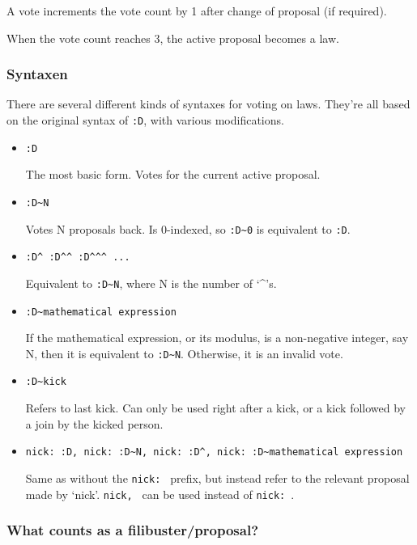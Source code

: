 \documentclass[11pt]{article}
\begin{document}
A vote increments the vote count by 1 after change of proposal (if required).

When the vote count reaches 3, the active proposal becomes a law.


\subsubsection{Syntaxen}
There are several different kinds of syntaxes for voting on laws. They're all based
on the original syntax of \texttt{:D}, with various modifications.

\begin{itemize}
\item \texttt{:D}

The most basic form. Votes for the current active proposal.

\item \texttt{:D\~{}N}

Votes N proposals back. Is 0-indexed, so \texttt{:D\~{}0} is equivalent to \texttt{:D}.

\item \texttt{:D\^{} :D\^{}\^{} :D\^{}\^{}\^{} ...}

Equivalent to \texttt{:D\~{}N}, where N is the number of `\^{}'s.

\item \texttt{:D\~{}mathematical expression}

If the mathematical expression, or its modulus, is a non-negative integer, say N, then
it is equivalent to \texttt{:D\~{}N}. Otherwise, it is an invalid vote.

\item \texttt{:D\~{}kick}

Refers to last kick. Can only be used right after a kick, or a kick followed by a join
by the kicked person.

\item \texttt{nick: :D, nick: :D\~{}N, nick: :D\^{}, nick: :D\~{}mathematical expression}

Same as without the \texttt{nick: } prefix, but instead refer to the relevant proposal
made by `nick'. \texttt{nick, } can be used instead of \texttt{nick: }.
\end{itemize}


\subsubsection{What counts as a filibuster/proposal?}
\end{document}

